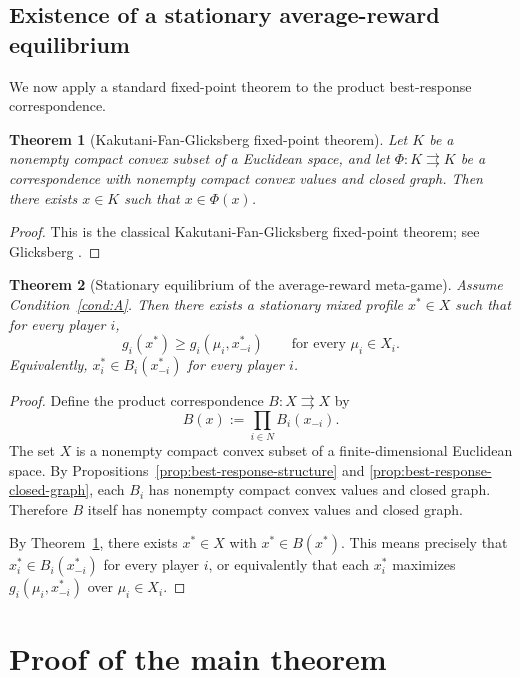 \documentclass[11pt]{article}
\newtheorem{theorem}{Theorem}[section]
\theoremstyle{definition}
\newcommand{\1}{\mathbf{1}}
\begin{document}
\subsection{Existence of a stationary average-reward equilibrium}

We now apply a standard fixed-point theorem to the product best-response correspondence.

\begin{theorem}[Kakutani-Fan-Glicksberg fixed-point theorem]\label{thm:kfg}
Let $K$ be a nonempty compact convex subset of a Euclidean space, and let $\Phi:K\rightrightarrows K$ be a correspondence with nonempty compact convex values and closed graph. Then there exists $x\in K$ such that $x\in \Phi(x)$.
\end{theorem}

\begin{proof}
This is the classical Kakutani-Fan-Glicksberg fixed-point theorem; see Glicksberg \cite{Glicksberg1952}.
\end{proof}

\begin{theorem}[Stationary equilibrium of the average-reward meta-game]\label{thm:meta-equilibrium}
Assume Condition~\ref{cond:A}. Then there exists a stationary mixed profile $x^*\in X$ such that for every player $i$,
\[
g_i(x^*)\ge g_i(\mu_i,x_{-i}^*)\qquad\text{for every }\mu_i\in X_i.
\]
Equivalently, $x_i^*\in B_i(x_{-i}^*)$ for every player $i$.
\end{theorem}

\begin{proof}
Define the product correspondence $B:X\rightrightarrows X$ by
\[
B(x):=\prod_{i\in N}B_i(x_{-i}).
\]
The set $X$ is a nonempty compact convex subset of a finite-dimensional Euclidean space. By Propositions~\ref{prop:best-response-structure} and \ref{prop:best-response-closed-graph}, each $B_i$ has nonempty compact convex values and closed graph. Therefore $B$ itself has nonempty compact convex values and closed graph.

By Theorem~\ref{thm:kfg}, there exists $x^*\in X$ with $x^*\in B(x^*)$. This means precisely that $x_i^*\in B_i(x_{-i}^*)$ for every player $i$, or equivalently that each $x_i^*$ maximizes $g_i(\mu_i,x_{-i}^*)$ over $\mu_i\in X_i$.
\end{proof}

\section{Proof of the main theorem}\label{sec:proof-main}
\end{document}
